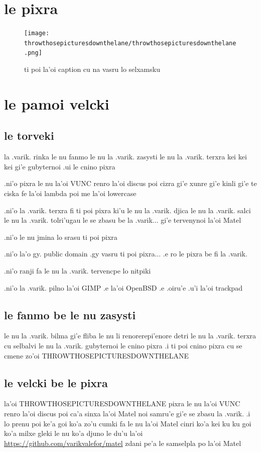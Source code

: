 \documentclass{report}
\begin{document}
\section{le pixra}
\begin{figure}[ht]
	\centering
	\texttt{[image: throwthosepicturesdownthelane/throwthosepicturesdownthelane.png]}
	\caption[center]{ti poi la'oi caption cu na vasru lo selxamsku}
\end{figure}
\section{le pamoi velcki}
\subsection{le torveki}
la .varik. rinka le nu fanmo le nu la .varik. zasysti le nu la .varik. terxra kei kei kei gi'e gubyternoi .ui le cnino pixra

.ni'o pixra le nu la'oi VUNC renro la'oi discus poi cizra gi'e xunre gi'e kinli gi'e te ciska fe la'oi lambda poi me la'oi lowercase

.ni'o la .varik. terxra fi ti poi pixra ki'u le nu la .varik. djica le nu la .varik. salci le nu la .varik. tolri'ugau le se zbasu be la .varik... gi'e tervenynoi la'oi Matel

.ni'o le nu jmina lo srasu ti poi pixra

.ni'o la'o gy. public domain .gy vasru ti poi pixra... .e ro le pixra be fi la .varik.

.ni'o ranji fa le nu la .varik. tervencpe lo nitpiki

.ni'o la .varik. pilno la'oi GIMP .e la'oi OpenBSD .e .oiru'e .u'i la'oi trackpad

\subsection{le fanmo be le nu zasysti}
le nu la .varik. bilma gi'e fliba le nu li renorerepi'enore detri le nu la .varik. terxra cu selbalvi le nu la .varik. gubyternoi le cnino pixra  .i ti poi cnino pixra cu se cmene zo'oi THROWTHOSEPICTURESDOWNTHELANE

\subsection{le velcki be le pixra}
la'oi THROWTHOSEPICTURESDOWNTHELANE pixra le nu la'oi VUNC renro la'oi discus poi ca'a sinxa la'oi Matel noi samru'e gi'e se zbasu la .varik.  .i lo prenu poi ke'a goi ko'a zo'u cumki fa le nu la'oi Matel cinri ko'a kei ku ku goi ko'a milxe gleki le nu ko'a djuno le du'u la'oi \url{https://github.com/varikvalefor/matel} zdani pe'a le samselpla po la'oi Matel
\end{document}

